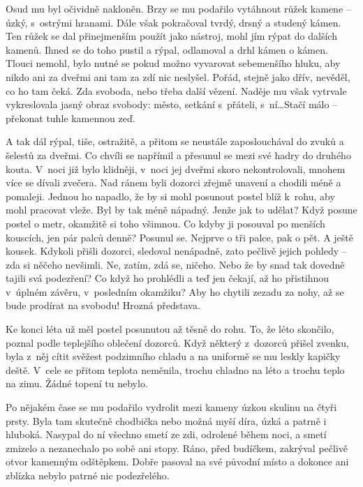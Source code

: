 Osud mu byl očividně nakloněn. Brzy se mu podařilo vytáhnout růžek kamene -- úzký, s ostrými hranami. Dále však pokračoval tvrdý, drsný a studený kámen. Ten růžek se dal přinejmenším použít jako nástroj, mohl jím rýpat do dalších kamenů. Ihned se do toho pustil a rýpal, odlamoval a drhl kámen o kámen. Tlouci nemohl, bylo nutné se pokud možno vyvarovat sebemenšího hluku, aby nikdo ani za dveřmi ani tam za zdí nic neslyšel. Pořád, stejně jako dřív, nevěděl, co ho tam čeká. Zda svoboda, nebo třeba další vězení. Naděje mu však vytrvale vykreslovala jasný obraz svobody: město, setkání s přáteli, s ní\ldots Stačí málo -- překonat tuhle kamennou zeď.

A tak dál rýpal, tiše, ostražitě, a přitom se neustále zaposlouchával do zvuků a šelestů za dveřmi. Co chvíli se napřímil a přesunul se mezi své hadry do druhého kouta. V noci již bylo klidněji, v noci jej dveřmi skoro nekontrolovali, mnohem více se dívali zvečera. Nad ránem byli dozorci zřejmě unavení a chodili méně a pomaleji. Jednou ho napadlo, že by si mohl posunout postel blíž k rohu, aby mohl pracovat vleže. Byl by tak méně nápadný. Jenže jak to udělat? Když posune postel o metr, okamžitě si toho všimnou. Co kdyby ji posouval po menších kouscích, jen pár palců denně? Posunul se. Nejprve o tři palce, pak o pět. A ještě kousek. Kdykoli přišli dozorci, sledoval nenápadně, zato pečlivě jejich pohledy -- zda si něčeho nevšimli. Ne, zatím, zdá se, ničeho. Nebo že by snad tak dovedně tajili svá podezření? Co když ho prohlédli a teď jen čekají, až ho přistihnou v úplném závěru, v posledním okamžiku? Aby ho chytili zezadu za nohy, až se bude prodírat na svobodu! Hrozná představa.

Ke konci léta už měl postel posunutou až těsně do rohu. To, že léto skončilo, poznal podle teplejšího oblečení dozorců. Když některý z dozorců přišel zvenku, byla z něj cítit svěžest podzimního chladu a na uniformě se mu leskly kapičky deště. V cele se přitom teplota neměnila, trochu chladno na léto a trochu teplo na zimu. Žádné topení tu nebylo.

Po nějakém čase se mu podařilo vydrolit mezi kameny úzkou skulinu na čtyři prsty. Byla tam skutečně chodbička nebo možná myší díra, úzká a patrně i hluboká. Nasypal do ní všechno smetí ze zdi, odrolené během noci, a smetí zmizelo a nezanechalo po sobě ani stopy. Ráno, před budíčkem, zakrýval pečlivě otvor kamenným odštěpkem. Dobře pasoval na své původní místo a dokonce ani zblízka nebylo patrné nic podezřelého.

